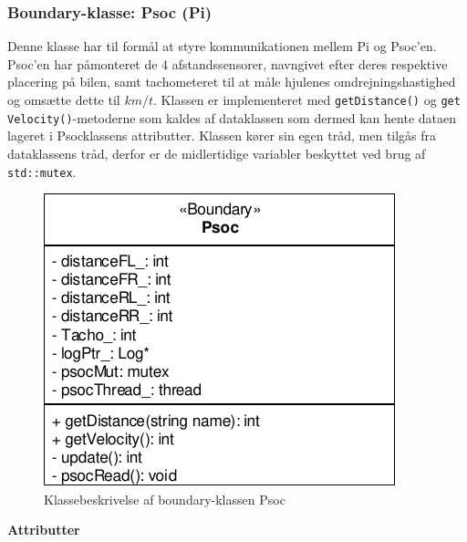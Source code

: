 \subsubsection{Boundary-klasse: Psoc (Pi)}\label{sec:sw_design_psoc_pi}

Denne klasse har til formål at styre \IIC kommunikationen mellem Pi og Psoc'en. 
Psoc'en har påmonteret de 4 afstandssensorer, navngivet efter deres respektive placering på bilen, samt tachometeret til at måle hjulenes omdrejningshastighed og omsætte dette til $km/t$. 
Klassen er implementeret med \texttt{getDistance()} og \texttt{get Velocity()}-metoderne som kaldes af dataklassen som dermed kan hente dataen lageret i Psocklassens attributter. 
Klassen kører sin egen tråd, men tilgås fra dataklassens tråd, derfor er de midlertidige variabler beskyttet ved brug af \texttt{std::mutex}.

\begin{figure}[h]
\centering
\includegraphics[]{../fig/diagrammer/bil/cd_psoc.pdf}
\caption{Klassebeskrivelse af boundary-klassen Psoc}
\label{fig:cd_psoc}
\end{figure}

\textbf{Attributter}


